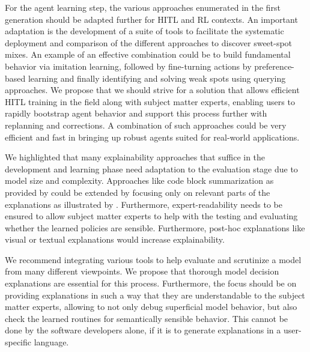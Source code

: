 \documentclass[twoside,11pt]{article}
\begin{document}
\begin{enumerate}

For the agent learning step, the various approaches enumerated in the first generation should be adapted further for HITL and RL contexts. An important adaptation is the development of a suite of tools to facilitate the systematic deployment and comparison of the different approaches to discover sweet-spot mixes. An example of an effective combination could be to build fundamental behavior via imitation learning, followed by fine-turning actions by preference-based learning and finally identifying and solving weak spots using querying approaches. We propose that we should strive for a solution that allows efficient HITL training in the field along with subject matter experts, enabling users to rapidly bootstrap agent behavior and support this process further with replanning and corrections. A combination of such approaches could be very efficient and fast in bringing up robust agents suited for real-world applications.


We highlighted that many explainability approaches that suffice in the development and learning phase need adaptation to the evaluation stage due to model size and complexity. Approaches like code block summarization as provided by \citet{VermaEtAl:2018:ProgrammaticallyInterpretableRL} could be extended by focusing only on relevant parts of the explanations as illustrated by \citet{Vu:2020:PGMExplainer}. Furthermore, expert-readability needs to be ensured to allow subject matter experts to help with the testing and evaluating whether the learned policies are sensible.
Furthermore, post-hoc explanations like visual \citep{DBLP:journals/corr/abs-1912-12191,DBLP:journals/corr/abs-1912-05743} or textual \citep{fukuchi2017autonomous,HayesShah:2017:AutonomousPolicyExplanation} explanations would increase explainability.

We recommend integrating various tools to help evaluate and scrutinize a model from many different viewpoints. We propose that thorough model decision explanations are essential for this process. Furthermore, the focus should be on providing explanations in such a way that they are understandable to the subject matter experts, allowing to not only debug superficial model behavior, but also check the learned routines for semantically sensible behavior. This cannot be done by the software developers alone, if it is to generate explanations in a user-specific language.


\end{enumerate}
\end{document}
